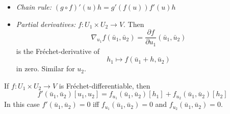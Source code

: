 \documentclass[../skript.tex]{subfiles}
\begin{document}
\begin{itemize}
\item \emph{Chain rule:} $(g \circ f)'(u) h = g'(f(u)) f'(u)h$
\item \emph{Partial derivatives:} $f : U_1 \times U_2 \to V$. Then
\[
	\nabla_{u_1} f(\bar{u}_1, \bar{u}_2) = \frac{\partial f}{\partial u_1}(\bar{u}_1, \bar{u}_2)
\]
is the Fréchet-derivative of
\[
	h_1 \mapsto f(\bar{u}_1 + h, \bar{u}_2)
\]
in zero. Similar for $u_2$.
\end{itemize}
\begin{proposition} %
\label{thm:c1e22}
If $f : U_1 \times U_2 \to V$ is Fréchet-differentiable, then
\[
	f'(\bar{u}_1, \bar{u}_2)[u_1, u_2] = f_{u_1} (\bar{u}_1, \bar{u}_2)[h_1] + f_{u_2} (\bar{u}_1, \bar{u}_2)[h_2]
\]
In this case $f'(\bar{u}_1, \bar{u}_2) = 0$ \ac{iff} $f_{u_1}(\bar{u}_1, \bar{u}_2) = 0$ and $f_{u_2}(\bar{u}_1, \bar{u}_2) = 0$.
\end{proposition}
\end{document}
